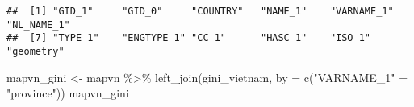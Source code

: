 \documentclass[
]{article}
\newenvironment{Shaded}{\begin{snugshade}}{\end{snugshade}}
\newcommand{\AttributeTok}[1]{\textcolor[rgb]{0.77,0.63,0.00}{#1}}
\newcommand{\FunctionTok}[1]{\textcolor[rgb]{0.00,0.00,0.00}{#1}}
\newcommand{\NormalTok}[1]{#1}
\newcommand{\OtherTok}[1]{\textcolor[rgb]{0.56,0.35,0.01}{#1}}
\newcommand{\SpecialCharTok}[1]{\textcolor[rgb]{0.00,0.00,0.00}{#1}}
\newcommand{\StringTok}[1]{\textcolor[rgb]{0.31,0.60,0.02}{#1}}
\begin{document}
\begin{verbatim}
##  [1] "GID_1"     "GID_0"     "COUNTRY"   "NAME_1"    "VARNAME_1" "NL_NAME_1"
##  [7] "TYPE_1"    "ENGTYPE_1" "CC_1"      "HASC_1"    "ISO_1"     "geometry"
\end{verbatim}

\begin{Shaded}
\begin{Highlighting}[]
\NormalTok{mapvn\_gini }\OtherTok{\textless{}{-}}\NormalTok{ mapvn }\SpecialCharTok{\%\textgreater{}\%} \FunctionTok{left\_join}\NormalTok{(gini\_vietnam, }\AttributeTok{by =} \FunctionTok{c}\NormalTok{(}\StringTok{"VARNAME\_1"} \OtherTok{=} \StringTok{"province"}\NormalTok{))}
\NormalTok{mapvn\_gini}
\end{Highlighting}
\end{Shaded}
\end{document}
